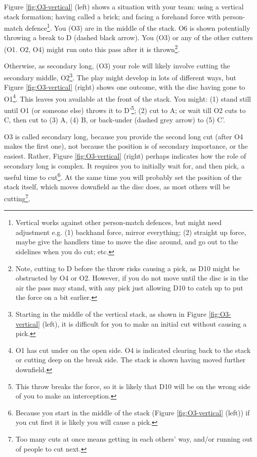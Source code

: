 \documentclass{tufte-handout}
\begin{document}
Figure \ref{fig:O3-vertical} (left) shows 
a situation 
with 
your team: 
using 
a vertical stack formation; 
having called a brick; and
facing a 
forehand force with 
person-match defence\footnote{
Vertical works
against other person-match defences, 
but might need 
adjustment e.g. 
(1) backhand force,
mirror everything;
(2) straight up force, 
maybe give the handlers 
time to move the disc around, 
and go out to the sidelines
when you do cut; etc.}. 
You (O3) 
are in the middle of 
the stack.
O6 is shown
potentially throwing 
a break
to D 
(dashed black arrow).
You 
(O3)
or any of the other cutters
(O1. O2, O4) 
might run onto 
this pass 
after it is thrown\footnote{
Note, cutting to D 
before the throw 
risks causing a pick, 
as D10 
might be obstructed
 by O4 
 or O2. 
 However, 
 if you do not move 
 until the disc is in the air
 the pass may stand,
 with any pick 
 just allowing 
 D10 to
 catch up 
 to put the force on 
 a bit earlier.}.

Otherwise, 
as secondary long, 
(O3) 
your role 
will likely 
involve cutting 
the secondary middle, O2\footnote{
Starting
in the middle of the vertical stack,
as shown in 
Figure \ref{fig:O3-vertical} (left),
it is difficult for 
you to make 
an initial cut 
without causing 
a pick.}.
The play might develop 
in lots of different ways, 
but
Figure \ref{fig:O3-vertical} (right) shows 
one outcome, 
with the disc 
having gone 
to O1\footnote{
O1 has cut under 
on the open side.
O4 is indicated 
clearing 
back to the stack 
or cutting 
deep on 
the break side. 
The stack is shown having 
moved further downfield.}. 
This leaves 
you 
available 
at the front of the stack. 
You might: 
(1) stand still until O1
(or someone else)  
throws it 
to D'\footnote{
This throw 
breaks the force, 
so it is likely 
that D10 will 
be on the wrong side 
of you to make an interception.};
(2) cut to A;
or wait till O2 
cuts to C, 
then cut to (3) A,
(4) B, or 
back-under 
(dashed grey arrow) 
to (5) C'.  

O3 is called secondary long, 
because you provide the second 
long cut 
(after O4 makes the first one), 
not 
because the position 
is of secondary importance, 
or the easiest. 
Rather, 
Figure \ref{fig:O3-vertical} (right)
perhaps indicates 
how 
the role of 
secondary long 
is complex. 
It requires you to  
initially wait for, 
and then pick, 
a useful time to cut\footnote{
Because you start 
in the middle of the stack 
(Figure \ref{fig:O3-vertical} (left)) 
if you cut first it is likely you will 
cause a pick.}. 
At the same time
you will probably  
set the position 
of the stack itself,
which moves downfield 
as the disc does, 
as most others 
will be  
cutting\footnote{
Too many cuts at once 
means getting 
in each others' way, 
and/or running out of people
to cut next.}. 
\end{document}
